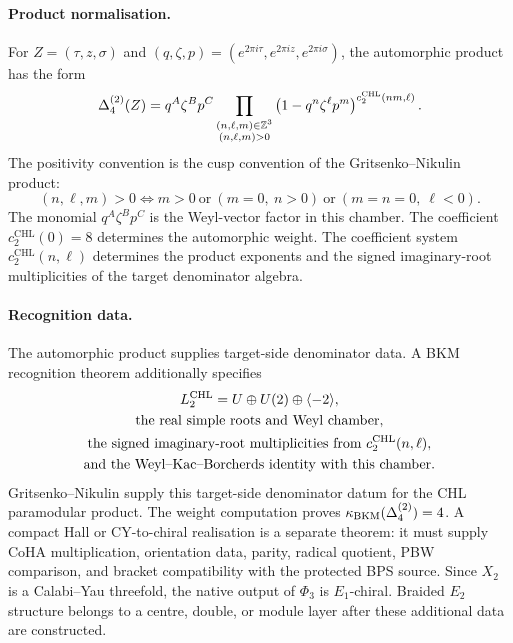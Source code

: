 \paragraph{Product normalisation.}
For $Z=(\tau,z,\sigma)$ and
$(q,\zeta,p)=(e^{2\pi i\tau},e^{2\pi iz},e^{2\pi i\sigma})$, the
automorphic product has the form
\[
  \Delta_{4}^{(2)}(Z)
  =
  q^A\zeta^B p^C
  \prod_{\substack{(n,\ell,m)\in\mathbb{Z}^3\\(n,\ell,m)>0}}
  \left(1-q^n\zeta^\ell p^m\right)^{
    c^{\mathrm{CHL}}_2(nm,\ell)} .
\]
The positivity convention is the cusp convention of the
Gritsenko--Nikulin product:
\[
  (n,\ell,m)>0
  \Longleftrightarrow
  m>0\ \text{or}\ (m=0,\ n>0)\ \text{or}\ (m=n=0,\ \ell<0).
\]
The monomial $q^A\zeta^B p^C$ is the Weyl-vector factor in this chamber.
The coefficient $c^{\mathrm{CHL}}_2(0)=8$ determines the automorphic
weight.  The coefficient system $c^{\mathrm{CHL}}_2(n,\ell)$ determines
the product exponents and the signed imaginary-root multiplicities of
the target denominator algebra.

\paragraph{Recognition data.}
The automorphic product supplies target-side denominator data.  A BKM
recognition theorem additionally specifies
\[
\begin{gathered}
  L^{\mathrm{CHL}}_{2}=U\oplus U(2)\oplus\langle -2\rangle,\\
  \text{the real simple roots and Weyl chamber,}\\
  \text{the signed imaginary-root multiplicities from }
  c^{\mathrm{CHL}}_2(n,\ell),\\
  \text{and the Weyl--Kac--Borcherds identity with this chamber.}
\end{gathered}
\]
Gritsenko--Nikulin supply this target-side denominator datum for the
CHL paramodular product.  The weight computation proves
$\kappa_{\mathrm{BKM}}(\Delta_{4}^{(2)})=4$.  A compact Hall or CY-to-chiral realisation is a
separate theorem: it must supply CoHA multiplication, orientation data,
parity, radical quotient, PBW comparison, and bracket compatibility with
the protected BPS source.  Since $X_2$ is a Calabi--Yau threefold, the
native output of $\Phi_3$ is $E_1$-chiral.  Braided $E_2$ structure
belongs to a centre, double, or module layer after these additional data
are constructed.

